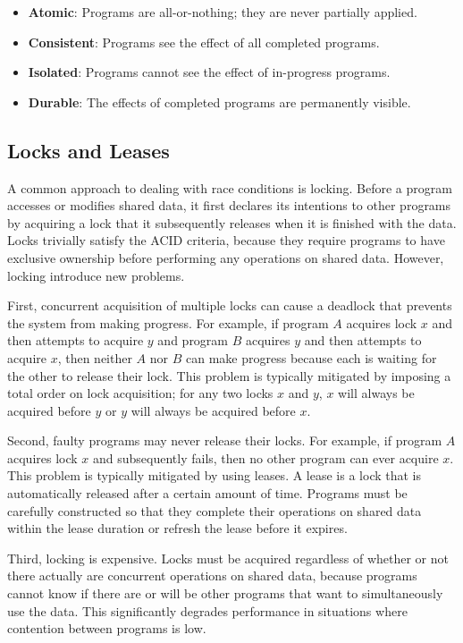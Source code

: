 \documentclass[../main.tex]{subfiles}
\begin{document}
\begin{itemize}
\item \textbf{Atomic}: Programs are all-or-nothing; they are never partially applied.
\item \textbf{Consistent}: Programs see the effect of all completed programs.
\item \textbf{Isolated}: Programs cannot see the effect of in-progress programs.
\item \textbf{Durable}: The effects of completed programs are permanently visible.
\end{itemize}

  \subsection{Locks and Leases}
  A common approach to dealing with race conditions is locking. Before a program accesses or
  modifies shared data, it first declares its intentions to other programs by acquiring a
  lock that it subsequently releases when it is finished with the data. Locks trivially satisfy
  the ACID criteria, because they require programs to have exclusive ownership before performing any
  operations on shared data. However, locking introduce new problems.

  First, concurrent acquisition of multiple locks can cause a deadlock that prevents the system from
  making progress. For example, if program $A$ acquires lock $x$ and then attempts to acquire $y$
  and program $B$ acquires $y$ and then attempts to acquire $x$, then neither $A$ nor $B$ can make
  progress because each is waiting for the other to release their lock. This problem is typically
  mitigated by imposing a total order on lock acquisition; for any two locks $x$ and $y$, $x$ will
  always be acquired before $y$ or $y$ will always be acquired before $x$.

  Second, faulty programs may never release their locks. For example, if program $A$ acquires lock
  $x$ and subsequently fails, then no other program can ever acquire $x$. This problem is typically
  mitigated by using leases. \cite{leases} A lease is a lock that is automatically released after a
  certain amount of time. Programs must be carefully constructed so that they complete their
  operations on shared data within the lease duration or refresh the lease before it expires.

  Third, locking is expensive. Locks must be acquired regardless of whether or not there actually
  are concurrent operations on shared data, because programs cannot know if there are or will be
  other programs that want to simultaneously use the data. This significantly degrades
  performance in situations where contention between programs is low.
\end{document}
